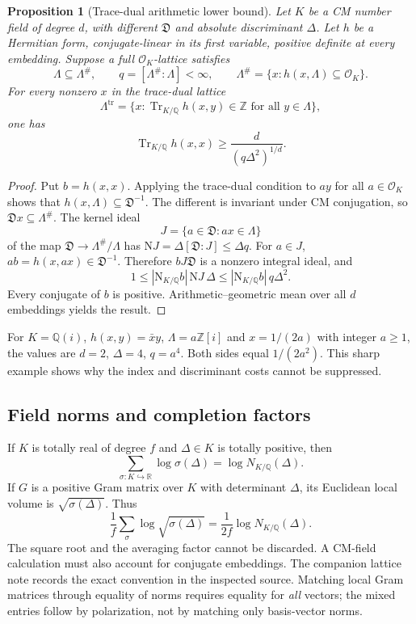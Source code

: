 \documentclass[11pt,letterpaper]{article}
\newtheorem{proposition}[theorem]{Proposition}
\theoremstyle{definition}
\theoremstyle{remark}
\newcommand{\R}{\mathbb R}
\newcommand{\Q}{\mathbb Q}
\newcommand{\Z}{\mathbb Z}
\numberwithin{equation}{section}
\begin{document}
\begin{proposition}[Trace-dual arithmetic lower bound]\label{prop:trace-dual}
Let $K$ be a CM number field of degree $d$, with different $\mathfrak D$ and absolute discriminant $\Delta$. Let $h$ be a Hermitian form, conjugate-linear in its first variable, positive definite at every embedding. Suppose a full $\mathcal O_K$-lattice satisfies
\[
 \Lambda\subseteq\Lambda^\#,\qquad
 q=[\Lambda^\#:\Lambda]<\infty,\qquad
 \Lambda^\#=\{x:h(x,\Lambda)\subseteq\mathcal O_K\}.
\]
For every nonzero $x$ in the trace-dual lattice
\[
 \Lambda^{\mathrm{tr}}
 =\{x:\operatorname{Tr}_{K/\Q}h(x,y)\in\Z\text{ for all }y\in\Lambda\},
\]
one has
\[
 \boxed{\operatorname{Tr}_{K/\Q}h(x,x)\ge\frac{d}{(q\Delta^2)^{1/d}}.}
\]
\end{proposition}
\begin{proof}
Put $b=h(x,x)$. Applying the trace-dual condition to $ay$ for all $a\in\mathcal O_K$ shows that $h(x,\Lambda)\subseteq\mathfrak D^{-1}$. The different is invariant under CM conjugation, so $\mathfrak D x\subseteq\Lambda^\#$. The kernel ideal
\[
 J=\{a\in\mathfrak D:ax\in\Lambda\}
\]
of the map $\mathfrak D\to\Lambda^\#/\Lambda$ has
$\mathrm NJ=\Delta[\mathfrak D:J]\le\Delta q$.
For $a\in J$, $ab=h(x,ax)\in\mathfrak D^{-1}$. Therefore $bJ\mathfrak D$ is a nonzero integral ideal, and
\[
 1\le|\mathrm N_{K/\Q}b|\,\mathrm NJ\,\Delta
 \le|\mathrm N_{K/\Q}b|\,q\Delta^2.
\]
Every conjugate of $b$ is positive. Arithmetic--geometric mean over all $d$ embeddings yields the result.
\end{proof}

For $K=\Q(i)$, $h(x,y)=\bar x y$, $\Lambda=a\Z[i]$ and $x=1/(2a)$ with integer $a\ge1$, the values are $d=2$, $\Delta=4$, $q=a^4$. Both sides equal $1/(2a^2)$. This sharp example shows why the index and discriminant costs cannot be suppressed.

\subsection{Field norms and completion factors}
If $K$ is totally real of degree $f$ and $\Delta\in K$ is totally positive, then
\[
 \sum_{\sigma:K\hookrightarrow\R}\log\sigma(\Delta)
 =\log N_{K/\Q}(\Delta).
\]
If $G$ is a positive Gram matrix over $K$ with determinant $\Delta$, its Euclidean local volume is $\sqrt{\sigma(\Delta)}$. Thus
\[
 \frac1f\sum_\sigma\log\sqrt{\sigma(\Delta)}
 =\frac1{2f}\log N_{K/\Q}(\Delta).
\]
The square root and the averaging factor cannot be discarded. A CM-field calculation must also account for conjugate embeddings. The companion lattice note records the exact convention in the inspected source. Matching local Gram matrices through equality of norms requires equality for \emph{all} vectors; the mixed entries follow by polarization, not by matching only basis-vector norms.
\end{document}
